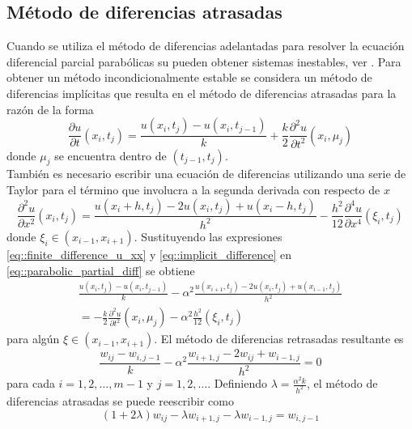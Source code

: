 \documentclass[a4paper]{article}
\begin{document}
\subsection{Método de diferencias atrasadas}
Cuando se utiliza el método de diferencias adelantadas para resolver la ecuación diferencial parcial parabólicas su pueden obtener sistemas inestables, ver \cite{Burden}. Para obtener un método incondicionalmente estable se considera un método de diferencias implícitas que resulta en el método de diferencias atrasadas para la razón de la forma
\begin{equation}\label{eq::implicit_difference}
\frac{\partial u}{\partial t}(x_i,t_j)=\frac{u(x_i,t_j)-u(x_i,t_{j-1})}{k}+\frac{k}{2}\frac{\partial ^2 u}{\partial t^2}(x_i,\mu_j)
\end{equation}
donde $\mu_j$ se encuentra dentro de $(t_{j-1},t_j)$.\\
También es necesario escribir una ecuación de diferencias utilizando una serie de Taylor para el término que involucra a la segunda derivada con respecto de $x$
\begin{equation}\label{eq::finite_difference_u_xx}
\frac{\partial^2 u}{\partial x^2}(x_i,t_j)=\frac{u(x_i+h,t_j)-2u(x_i,t_j)+u(x_i-h,t_j)}{h^2}-\frac{h^2}{12}\frac{\partial^4 u}{\partial x^4}(\xi_i,t_j)
\end{equation}
donde $\xi_i\in (x_{i-1},x_{i+1})$.
Sustituyendo las expresiones \ref{eq::finite_difference_u_xx} y \ref{eq::implicit_difference} en \ref{eq::parabolic_partial_diff} se obtiene 
\begin{equation}
\begin{aligned}
\frac{u(x_i,t_j)-u(x_i,t_{j-1})}{k}-\alpha^2 \frac{u(x_{i+1},t_{j})-2u(x_{i},t_{j})+u(x_{i-1},t_{j})}{h^2}\\
=-\frac{k}{2}\frac{\partial^2 u}{\partial t^2}(x_i,\mu_j)-\alpha^2\frac{h^2}{12}(\xi_i,t_j)
\end{aligned}
\end{equation}
para algún $\xi \in (x_{i-1},x_{i+1})$. El método de diferencias retrasadas resultante es 
\begin{equation}\label{eq::backward_difference_method}
\frac{w_{ij}-w_{i,j-1}}{k}-\alpha^2\frac{w_{i+1,j}-2w_{ij}+w_{i-1,j}}{h^2}=0
\end{equation}
para cada $i=1,2,\hdots,m-1$ y $j=1,2,\hdots$. Definiendo $\lambda=\frac{\alpha^2 k}{h^2}$, el método de diferencias atrasadas se puede reescribir como
\begin{equation}\label{eq::backward_difference_method_lambda}
(1+2\lambda)w_{ij}-\lambda w_{i+1,j}-\lambda w_{i-1,j}=w_{i,j-1}
\end{equation}
\end{document}
